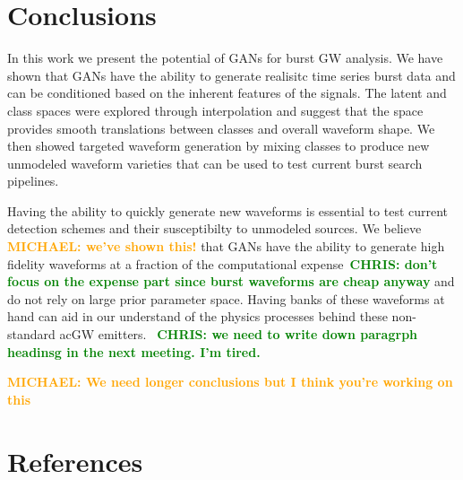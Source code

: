 \documentclass[12pt]{iopart}
\newcommand{\chris}[1]{\textbf{\textcolor{green}{CHRIS: #1}}}
\newcommand{\michael}[1]{\textbf{\textcolor{orange}{MICHAEL: #1}}}
\begin{document}
\section{Conclusions}

%
In this work we present the potential of \acp{GAN} for
burst \ac{GW} analysis. We have shown that \acp{GAN} have the ability to generate realisitc time series burst data and can be conditioned based on the inherent features of the signals. The latent and class spaces were explored through interpolation and
suggest that the space provides smooth translations between classes and overall
waveform shape. We then showed targeted waveform generation by mixing classes
to produce new unmodeled waveform varieties that can be used to test current
burst search pipelines.

%

Having the ability to quickly
generate new waveforms is essential to test current detection schemes and their
susceptibilty to unmodeled sources. We believe \michael{we've shown this!} that \acp{GAN} have the ability
to generate high fidelity waveforms at a fraction of the computational
expense~\chris{don't focus on the expense part since burst waveforms are cheap
anyway} and do not rely on large prior parameter space. Having banks of these
waveforms at hand can aid in our understand of the physics processes behind
these non-standard ac{GW} emitters.  
~\chris{we need to write down paragrph headinsg in the next meeting. I'm tired.}

\michael{We need longer conclusions but I think you're working on this}

\section*{References}

\end{document}
